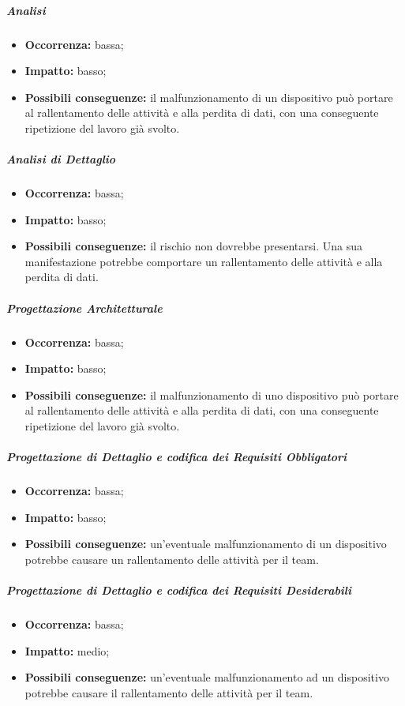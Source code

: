 \documentclass[../PianoProgetto.tex]{subfiles}
\begin{document}
		\subparagraph*{Analisi}
			\begin{itemize}[label={-}]
				\item \textbf{Occorrenza:} bassa;
				\item \textbf{Impatto:} basso;
				\item \textbf{Possibili conseguenze:} il malfunzionamento di un dispositivo può portare al rallentamento delle attività e alla perdita di dati, con una conseguente ripetizione del lavoro già svolto.
			\end{itemize}
			
		\subparagraph*{Analisi di Dettaglio}
			\begin{itemize}[label={-}]
				\item \textbf{Occorrenza:} bassa;
				\item \textbf{Impatto:} basso;
				\item \textbf{Possibili conseguenze:} il rischio non dovrebbe presentarsi. Una sua manifestazione potrebbe comportare un rallentamento delle attività e alla perdita di dati.
			\end{itemize}
			
		\subparagraph*{Progettazione Architetturale}
			\begin{itemize}[label={-}]
				\item \textbf{Occorrenza:} bassa;
				\item \textbf{Impatto:} basso;
				\item \textbf{Possibili conseguenze:} il malfunzionamento di uno dispositivo può portare al rallentamento delle attività e alla perdita di dati, con una conseguente ripetizione del lavoro già svolto.
			\end{itemize}
			
		\subparagraph*{Progettazione di Dettaglio e codifica dei Requisiti Obbligatori}
			\begin{itemize}[label={-}]
				\item \textbf{Occorrenza:} bassa;
				\item \textbf{Impatto:} basso;
				\item \textbf{Possibili conseguenze:} un'eventuale malfunzionamento di un dispositivo potrebbe causare un rallentamento delle attività per il team.
			\end{itemize}
			
		\subparagraph*{Progettazione di Dettaglio e codifica dei Requisiti Desiderabili}
			\begin{itemize}[label={-}]
				\item \textbf{Occorrenza:} bassa;
				\item \textbf{Impatto:} medio;
				\item \textbf{Possibili conseguenze:} un'eventuale malfunzionamento ad un dispositivo potrebbe causare il rallentamento delle attività per il team.
			\end{itemize}
			
\end{document}
